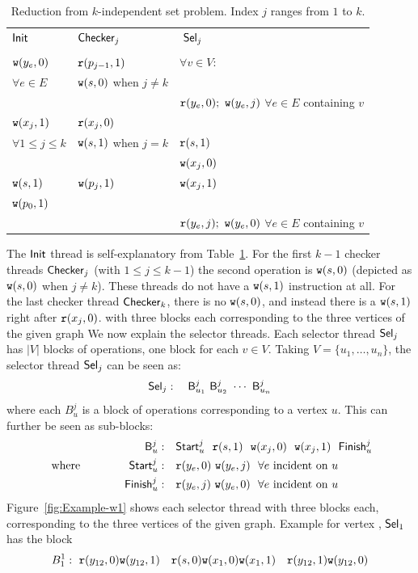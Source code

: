 

 

\begin{table}
\centering
\caption{Reduction from $k$-independent set problem. Index $j$ ranges from $1$ to $k$.}
\label{tab:independent-set}
\medskip
\centering
\begin{tabular}{l  @{\qquad} l  @{\qquad} l }
    $\mathsf{Init}$ &  $\mathsf{Checker}_j$ & $~\mathsf{Sel}_j$ \\
    &  & \\
$\mathtt{w}(y_e, 0)$   &  $\mathtt{r}(p_{j-1}, 1)$ &   $\forall v \in V:$  \\
$\forall e \in E$  &  $\mathtt{w}(s, 0)$ when $j \neq k$ &  \\
& & $\mathtt{r}(y_e, 0);~\mathtt{w}(y_e, j)$ \quad $\forall e \in E$ containing $v$ \\
$\mathtt{w}(x_j, 1)$ &  $\mathtt{r}(x_j, 0)$  &  \\
$\forall 1 \le j \le k$ & $\mathtt{w}(s, 1)$ when $j = k$  & $\mathtt{r}(s, 1)$   \\
  & &  $\mathtt{w}(x_j, 0)$   \\
$\mathtt{w}(s, 1)$ & $\mathtt{w}(p_j, 1)$ &  $\mathtt{w}(x_j, 1)$  \\
$\mathtt{w}(p_0, 1)$ & &   \\
 & &   $\mathtt{r}(y_e, j);~\mathtt{w}(y_e, 0)$ \quad $\forall e \in E$ containing $v$  
\end{tabular}
\end{table}

The $\mathsf{Init}$ thread is self-explanatory from Table~\ref{tab:independent-set}. For the first $k-1$ checker threads $\mathsf{Checker}_j$ (with $1 \le j \le k-1$) the second operation is $\mathtt{w}(s, 0)$ (depicted as $\mathtt{w}(s,0)$ when $j \neq k$). These threads do not have a $\mathtt{w}(s,1)$ instruction at all. For the last checker thread $\mathsf{Checker}_k$, there is no $\mathtt{w}(s,0)$, and instead there is a $\mathtt{w}(s, 1)$ right after $\mathtt{r}(x_j, 0)$. 
with three blocks each corresponding to the three vertices of the given graph
We now explain the selector threads. Each selector thread $\mathsf{Sel}_j$  
has $|V|$ blocks of operations, one block for each $v \in V$. Taking $V = \{u_1, \dots, u_n\}$, the selector thread $\mathsf{Sel}_j$ can be seen as:
\begin{align*}
 \mathsf{Sel}_j: \quad \mathsf{B}^j_{u_1}~ \mathsf{B}^j_{u_2}~\cdots~ \mathsf{B}^j_{u_n}
\end{align*} 
where each $B^j_u$ is a block of operations corresponding to a vertex $u$. This can further be seen as sub-blocks:
\begin{align*}
 \mathsf{B}^j_u:~~&~  \mathsf{Start}^j_u ~~\mathtt{r}(s, 1) ~~ \mathtt{w}(x_j, 0) ~~ \mathtt{w}(x_j, 1) ~~ \mathsf{Finish}^j_u \\
 \text{ where~} \qquad \qquad \mathsf{Start}^j_u: ~~& ~\mathtt{r}(y_e, 0) ~ \mathtt{w}(y_e, j) ~~ \forall e  \text{ incident on } u \\
\mathsf{Finish}^j_u: ~~& ~\mathtt{r}(y_e, j) ~ \mathtt{w}(y_e, 0) ~~ \forall e \text{ incident on } u
\end{align*}
Figure~\ref{fig:Example-w1} shows each selector thread with three blocks each, corresponding to the three vertices of the given graph. Example for vertex , $\mathsf{Sel}_1$ has the block 
 $$B_1^1:~\mathtt{r}(y_{12},0) \mathtt{w}(y_{12},1) \quad \mathtt{r}(s,0) \mathtt{w}(x_1,0) \mathtt{w}(x_1,1) \quad \mathtt{r}(y_{12},1) \mathtt{w}(y_{12},0)$$
 

